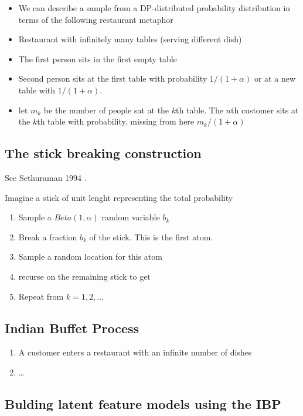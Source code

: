 \documentclass[b5paper]{report}
\begin{document}
\begin{itemize}
  \item We can describe a sample from a DP-distributed probability distribution
    in terms of the following restaurant metaphor
  \item Restaurant with infinitely many tables (serving different dish)
  \item The first person sits in the first empty table
  \item Second person sits at the first table with probability $1/(1+\alpha)$ or
    at a new table with $1/(1+\alpha)$.
  \item let $m_k$ be the number of people sat at the $k$th table. The $n$th
    customer sits at the $k$th table with probability. missing from here $m_k/(1 + \alpha)$

\end{itemize}

\subsection{The stick breaking construction}

See Sethuraman 1994 \cite{sethuraman1994constructive}.

Imagine a stick of unit lenght representing the total probability

\begin{enumerate}
  \item Sample a $Beta(1, \alpha)$ random variable $b_k$
  \item Break a fraction $b_k$ of the stick. This is the first atom.
  \item Sample a random location for this atom
  \item recurse on the remaining stick to get
  \item Repeat from $k = 1,2,\dots$
\end{enumerate}

\subsection{Indian Buffet Process}

\begin{enumerate}
  \item A customer enters a restaurant with an infinite number of dishes
  \item \dots
\end{enumerate}

\subsection{Bulding latent feature models using the IBP}
\end{document}
